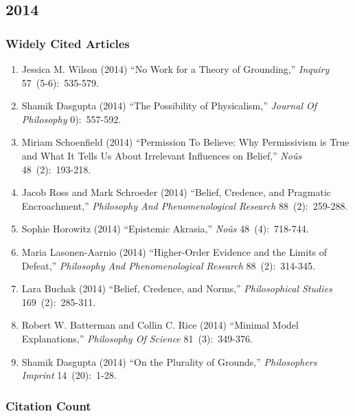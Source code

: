 \documentclass[
  10pt,
  letterpaper,
  DIV=11,
  numbers=noendperiod,
  twoside]{scrartcl}
\providecommand{\tightlist}{%
  \setlength{\itemsep}{0pt}\setlength{\parskip}{0pt}}\usepackage{longtable,booktabs,array}
\begin{document}
\newpage

\subsection{2014}\label{sec-s2014}

\subsubsection*{Widely Cited Articles}\label{widely-cited-articles-57}

\begin{enumerate}
\def\labelenumi{\arabic{enumi}.}
\tightlist
\item
  Jessica M. Wilson (2014) ``No Work for a Theory of Grounding,''
  \emph{Inquiry} 57~(5-6):~535-579.
\item
  Shamik Dasgupta (2014) ``The Possibility of Physicalism,''
  \emph{Journal Of Philosophy} 0):~557-592.
\item
  Miriam Schoenfield (2014) ``Permission To Believe: Why Permissivism is
  True and What It Tells Us About Irrelevant Influences on Belief,''
  \emph{Noûs} 48~(2):~193-218.
\item
  Jacob Ross and Mark Schroeder (2014) ``Belief, Credence, and Pragmatic
  Encroachment,'' \emph{Philosophy And Phenomenological Research}
  88~(2):~259-288.
\item
  Sophie Horowitz (2014) ``Epistemic Akrasia,'' \emph{Noûs}
  48~(4):~718-744.
\item
  Maria Lasonen-Aarnio (2014) ``Higher-Order Evidence and the Limits of
  Defeat,'' \emph{Philosophy And Phenomenological Research}
  88~(2):~314-345.
\item
  Lara Buchak (2014) ``Belief, Credence, and Norms,''
  \emph{Philosophical Studies} 169~(2):~285-311.
\item
  Robert W. Batterman and Collin C. Rice (2014) ``Minimal Model
  Explanations,'' \emph{Philosophy Of Science} 81~(3):~349-376.
\item
  Shamik Dasgupta (2014) ``On the Plurality of Grounds,''
  \emph{Philosophers Imprint} 14~(20):~1-28.
\end{enumerate}

\subsubsection*{Citation Count}\label{sec-count-2014}
\end{document}

